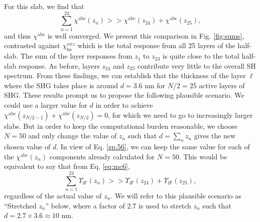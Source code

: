 \documentclass[utf8]{frontiersSCNS}
\begin{document}
For this slab, we find that
\begin{equation}\label{zp.56}
\sum_{n=1}^{23}\chi^{\mathrm{abc}}(z_{n}) 
>> \chi^{\mathrm{abc}}(z_{24})+\chi^{\mathrm{abc}}(z_{25}),
\end{equation} 
and thus $\chi^{\mathrm{abc}}$ is well converged. We present this comparison in
Fig. \ref{fig:sums}, contrasted against $\chi^{xxz}_{\mathrm{hs}}$ which is the
total response from all 25 layers of the half-slab. The sum of the layer
responses from $z_{1}$ to $z_{23}$ is quite close to the total half-slab
response. As before, layers $z_{24}$ and $z_{25}$ contribute very little to the
overall SH spectrum. From these findings, we can establish that the thickness of
the layer $\ell$ where the SHG takes place is around $d = 3.6$ nm for $N/2 = 25$
active layers of SHG. These results prompt us to propose the following plausible
scenario. We could use a larger value for $d$ in order to achieve
$\chi^{\mathrm{abc}}(z_{N/2-1}) + \chi^{\mathrm{abc}}(z_{N/2}) = 0$, for which
we need to go to increasingly larger slabs. But in order to keep the
computational burden reasonable, we choose $N = 50$ and only change the value of
$z_{n}$ such that $d = \sum_{n} z_{n}$ gives the new chosen value of $d$. In
view of Eq. \eqref{zp.56}, we can keep the same value for each of the
$\chi^{\mathrm{abc}}(z_{n})$ components already calculated for $N = 50$. This
would be equivalent to say that from Eq. \eqref{eq:mc6},
\begin{equation}\label{zp.57}
\sum_{n=1}^{23}\Upsilon_{\mathrm{iF}}(z_{n}) 
>>\Upsilon_{\mathrm{iF}}(z_{24}) +\Upsilon_{\mathrm{iF}}(z_{25}),
\end{equation}  
regardless of the actual value of $z_{n}$. We will refer to this plausible
scenario as ``Stretched $z_{n}$'' below, where a factor of 2.7 is used to stretch $z_{n}$ such that $d = 2.7 \times 3.6 \approx 10$ nm.
\end{document}
